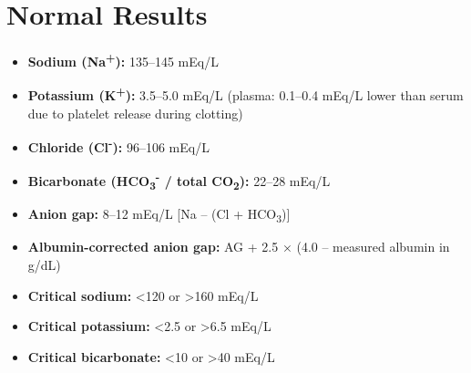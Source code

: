 \section*{Normal Results}
\begin{itemize}
  \item \textbf{Sodium (Na\textsuperscript{+}):} 135--145 mEq/L
  \item \textbf{Potassium (K\textsuperscript{+}):} 3.5--5.0 mEq/L (plasma: 0.1--0.4 mEq/L lower than serum due to platelet release during clotting)
  \item \textbf{Chloride (Cl\textsuperscript{-}):} 96--106 mEq/L
  \item \textbf{Bicarbonate (HCO\textsubscript{3}\textsuperscript{-} / total CO\textsubscript{2}):} 22--28 mEq/L
  \item \textbf{Anion gap:} 8--12 mEq/L [Na -- (Cl + HCO\textsubscript{3})]
  \item \textbf{Albumin-corrected anion gap:} AG + 2.5 $\times$ (4.0 -- measured albumin in g/dL)
  \item \textbf{Critical sodium:} <120 or >160 mEq/L
  \item \textbf{Critical potassium:} <2.5 or >6.5 mEq/L
  \item \textbf{Critical bicarbonate:} <10 or >40 mEq/L
\end{itemize}

